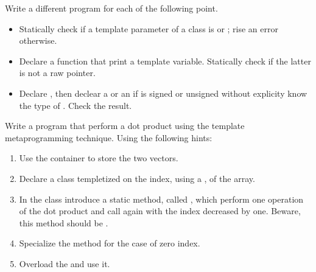Write a different program for each of the following point.
\begin{itemize}

    \item Statically check if a template parameter of a class is  or
    ; rise an error otherwise.

    \item Declare a function that print a template variable. Statically check
    if the latter is not a raw pointer.

    \item Declare , then declear a  or an 
    if  is signed or unsigned without explicity know the type of .
    Check the result.

\end{itemize}

Write a program that perform a dot product using the template metaprogramming
technique. Using the following hints:

\begin{enumerate}

    \item Use the container  to store the two vectors.

    \item Declare a class templetized on the index, using a
    , of the array.

    \item In the class introduce a static method, called , which
    perform one operation of the dot product and call again  with the
    index decreased by one. Beware, this method should be .

    \item Specialize the method  for the case of zero index.

    \item Overload the  and use it.

\end{enumerate}
